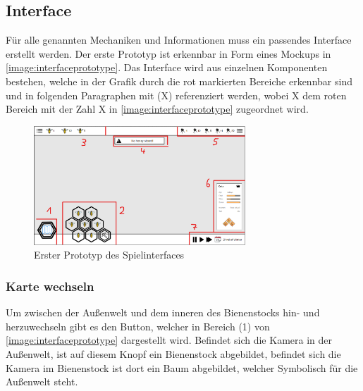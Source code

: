 \subsection{Interface}
Für alle genannten Mechaniken und Informationen muss ein passendes Interface erstellt werden. Der erste Prototyp ist erkennbar in Form eines Mockups in  \autoref{image:interfaceprototype}. Das Interface wird aus einzelnen Komponenten bestehen, welche in der Grafik durch die rot markierten Bereiche erkennbar sind und in folgenden Paragraphen mit (X) referenziert werden, wobei X dem roten Bereich mit der Zahl X in \autoref{image:interfaceprototype} zugeordnet wird.

\begin{figure}
    \begin{center}
        \includegraphics[width=300px]{0.bilder/interfaceprototype.png}
    \end{center}
    \caption{Erster Prototyp des Spielinterfaces} \label{image:interfaceprototype}
\end{figure}

\subsubsection{Karte wechseln}
Um zwischen der Außenwelt und dem inneren des Bienenstocks hin- und herzuwechseln gibt es den Button, welcher in Bereich (1) von \autoref{image:interfaceprototype} dargestellt wird. Befindet sich die Kamera in der Außenwelt, ist auf diesem Knopf ein Bienenstock abgebildet, befindet sich die Kamera im Bienenstock ist dort ein Baum abgebildet, welcher Symbolisch für die Außenwelt steht.

